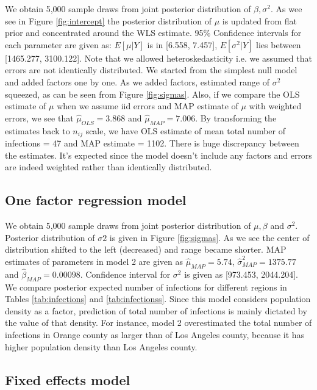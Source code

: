 \documentclass[11pt,twocolumn]{asaproc}
\begin{document}
We obtain 5,000 sample draws from joint posterior distribution of $\beta, \sigma^2$. As wee see in Figure \ref{fig:intercept} the posterior distribution of $\mu$ is updated from flat prior and concentrated around the WLS estimate. 95\% Confidence intervals for each parameter are given as: $E[\mu | Y]$ is in [6.558, 7.457], $E[\sigma^2 | Y]$ lies between [1465.277, 3100.122]. Note that we allowed heteroskedasticity i.e. we assumed that errors are not identically distributed. We started from the simplest null model and added factors one by one. As we added factors, estimated range of $\sigma^2$ squeezed, as can be seen from Figure \ref{fig:sigmas}. Also, if we compare the OLS estimate of $\mu$ when we assume iid errors and MAP estimate of $\mu$ with weighted errors, we see that $\hat{\mu}_{OLS} = 3.868$ and $\hat{\mu}_{MAP} = 7.006$. By transforming the estimates back to $n_{ij}$ scale, we have OLS estimate of mean total number of infections = 47 and MAP estimate = 1102. There is huge discrepancy between the estimates. It's expected since the model doesn't include any factors and errors are indeed weighted rather than identically distributed. 




\subsection{One factor regression model}

We obtain 5,000 sample draws from joint posterior distribution of $\mu, \beta$ and $\sigma^2$. Posterior distribution of $\sigma2$ is given in Figure \ref{fig:sigmas}. As we see the center of distribution shifted to the left (decreased) and range became shorter. MAP estimates of parameters in model 2 are given as $\hat{\mu}_{MAP} = 5.74$, $\hat{\sigma}^2_{MAP} = 1375.77$ and $\hat{\beta}_{MAP} = 0.00098$. Confidence interval for $\sigma^2$ is given as [973.453, 2044.204]. We compare posterior expected number of infections for different regions in Tables \ref{tab:infections} and \ref{tab:infectionss}. Since this model considers population density as a factor, prediction of total number of infections is mainly dictated by the value of that density. For instance, model 2 overestimated the total number of infections in Orange county as larger than of Los Angeles county, because it has higher population density than Los Angeles county.




\subsection{Fixed effects model}
\end{document}
